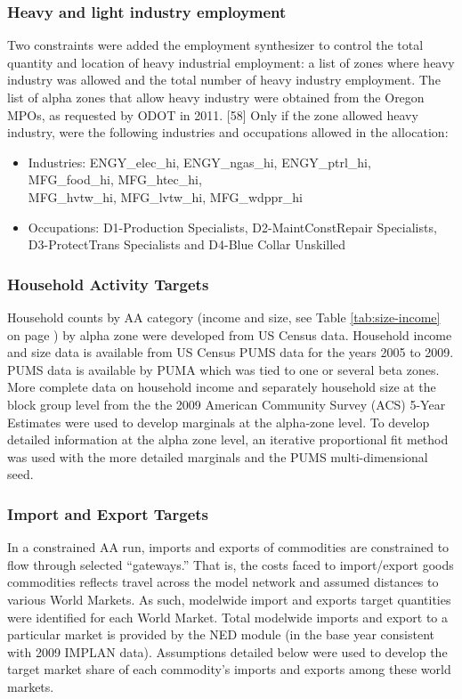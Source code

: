 \subsubsection{Heavy and light industry employment}
Two constraints were added the employment synthesizer to control the total quantity and location of heavy industrial employment:  a list of zones where heavy industry was allowed and the total number of heavy industry employment. The list of alpha zones that allow heavy industry were obtained from the Oregon MPOs, as requested by ODOT in 2011. [58]  Only if the zone allowed heavy industry, were the following industries and occupations allowed in the allocation: 
\begin{itemize}
\item {Industries: ENGY\_elec\_hi, ENGY\_ngas\_hi, ENGY\_ptrl\_hi, MFG\_food\_hi, MFG\_htec\_hi, \\
MFG\_hvtw\_hi, MFG\_lvtw\_hi, MFG\_wdppr\_hi}
\item Occupations:  D1-Production Specialists, D2-MaintConstRepair Specialists, D3-ProtectTrans Specialists and D4-Blue Collar Unskilled
\end{itemize}

\subsubsection{Household Activity Targets}
Household counts by AA category (income and size, see Table \ref{tab:size-income} on page \pageref{tab:size-income}) by alpha zone were developed from US Census data. Household income and size data is available from US Census PUMS data for the years 2005 to 2009. PUMS data is available by PUMA which was tied to one or several beta zones. More complete data on household income and separately household size at the block group level from the the 2009 American Community Survey (ACS) 5-Year Estimates were used to develop marginals at the alpha-zone level. To develop detailed information at the alpha zone level, an iterative proportional fit method was used with the more detailed marginals and the PUMS multi-dimensional seed. 

\subsubsection{Import and Export Targets}

In a constrained AA run, imports and exports of commodities are constrained to flow through selected ``gateways.'' That is, the costs faced to import/export goods commodities reflects travel across the model network and assumed distances to various World Markets. As such, modelwide import and exports target quantities were identified for each World Market. Total modelwide imports and export to a particular market is provided by the NED module (in the base year consistent with 2009 IMPLAN data). Assumptions detailed below were used to develop the target market share of each commodity's imports and exports among these world markets. 

